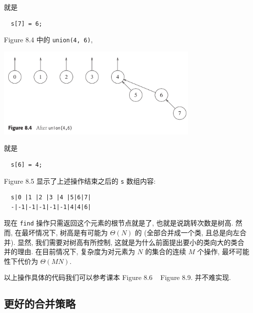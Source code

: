 \documentclass[a4paper]{ctexart}
\theoremstyle{definition}
\theoremstyle{definition}
\begin{document}
就是
\begin{lstlisting}
  s[7] = 6;
\end{lstlisting}
Figure 8.4 中的 \verb|union(4, 6)|, 
\begin{center}
  \includegraphics[width=0.75\textwidth]{images/FIG8_4.png}
\end{center}
就是
\begin{lstlisting}
  s[6] = 4;  
\end{lstlisting}
Figure 8.5 显示了上述操作结束之后的 \verb|s| 数组内容:
\begin{lstlisting}
  s|0 |1 |2 |3 |4 |5|6|7|
  -|-1|-1|-1|-1|-1|4|4|6|    
\end{lstlisting}

现在 \verb|find| 操作只需返回这个元素的根节点就是了, 也就是说跳转次数是树高. 
然而, 在最坏情况下, 树高是有可能为 $\Theta(N)$ 的 (全部合并成一个类, 且总是向左合并). 
显然, 我们需要对树高有所控制, 这就是为什么前面提出要小的类向大的类合并的理由. 
在目前情况下, 复杂度为对元素为 $N$ 的集合的连续 $M$ 个操作, 
最坏可能性下代价为 $\Theta(M N)$. 

以上操作具体的代码我们可以参考课本 Figure 8.6 ~ Figure 8.9. 并不难实现.

\subsection{更好的合并策略}
\end{document}
